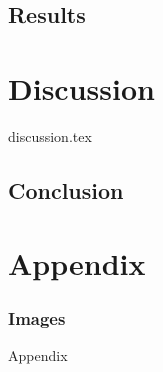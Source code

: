 \documentclass[printGloss]{_NoTouch/myProject}
\begin{document}

\newpage
\chapter{Results}


\newpage
\part{Discussion}
{discussion.tex}

\newpage
\chapter{Conclusion}


\appendix
\part*{Appendix}

\section{Images}\label{ap:sfd}
{Appendix}
\end{document}
